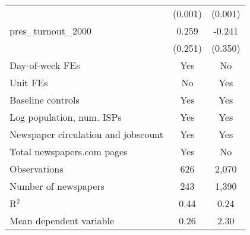 {\begin{tabular}{l*{2}{c}}
                    &     (0.001)         &     (0.001)         \\
\addlinespace
pres\_turnout\_2000   &       0.259         &      -0.241         \\
                    &     (0.251)         &     (0.350)         \\
\addlinespace
Day-of-week FEs     &         Yes         &          No         \\
\addlinespace
Unit FEs            &          No         &         Yes         \\
\addlinespace
Baseline controls   &         Yes         &         Yes         \\
\addlinespace
Log population, num. ISPs &         Yes         &         Yes         \\
\addlinespace
Newspaper circulation and jobscount &         Yes         &         Yes         \\
\addlinespace
Total newspapers.com pages &         Yes         &          No         \\
\midrule
Observations        &         626         &       2,070         \\
Number of newspapers&         243         &       1,390         \\
R$^2$               &        0.44         &        0.24         \\
Mean dependent variable&        0.26         &        2.30         \\
\bottomrule
\end{tabular}
}
